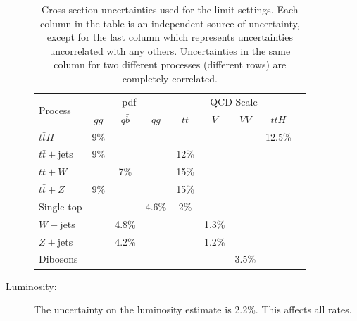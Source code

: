 \begin{description}
\begin{table}[hbtp]
\centering
\begin{tabular}{|l|c|c|c|c|c|c|c|c|}
\hline\hline
\multirow{2}{*}{Process} & \multicolumn{3}{c|}{pdf} & \multicolumn{4}{c|}{QCD Scale} \\
\cline{2-8}
                & $gg$  & $q\bar{b}$ & $qg$  & $t\bar{t}$ & $V$   & $VV$  & $t\bar{t}H$\\
\hline
$t\bar{t}H$     & 9\%   &            &       &            &       &       & 12.5\% \\
\hline
$t\bar{t}+$jets & 9\%   &            &       & 12\%       &       &       &      \\
\hline
$t\bar{t}+W$    &       & 7\%        &       & 15\%       &       &       &  \\
\hline
$t\bar{t}+Z$    & 9\%   &            &       & 15\%        &       &       &  \\
\hline
Single top      &       &            & 4.6\% &  2\%       &       &       &    \\
\hline
$W+$jets        &       & 4.8\%      &       &            & 1.3\% &       &   \\
\hline
$Z+$jets        &       & 4.2\%      &       &            & 1.2\% &       &  \\
\hline
Dibosons        &       &            &       &            &       & 3.5\% &  \\
\hline\hline
\end{tabular}
\caption{Cross section uncertainties used for the limit settings.  Each column in the table is an independent source of uncertainty, except for the last column which represents uncertainties uncorrelated with any others.  Uncertainties in the same column for two different processes (different rows) are completely correlated.}
\label{tab:xsUncertainty}
\end{table}

 \item[Luminosity:] The uncertainty on the luminosity estimate is 2.2\%.  This affects all rates.


\end{description}
